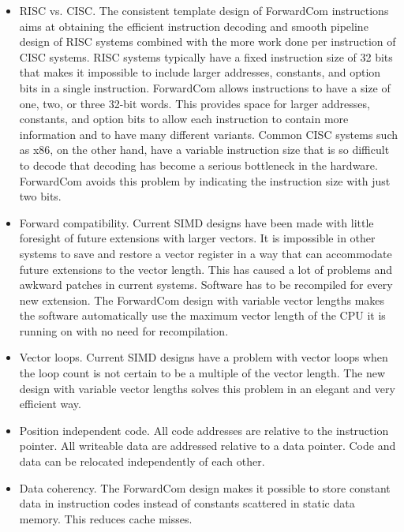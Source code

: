 \documentclass[forwardcom.tex]{subfiles}
\begin{document}
\begin{itemize}
\item RISC vs. CISC. The consistent template design of ForwardCom instructions aims at obtaining the efficient instruction decoding and smooth pipeline design of RISC systems combined with the more work done per instruction of CISC systems. RISC systems typically have a fixed instruction size of 32 bits that makes it impossible to include larger addresses, constants, and option bits in a single instruction. ForwardCom allows instructions to have a size of one, two, or three 32-bit words. This provides space for larger addresses, constants, and option bits to allow each instruction to contain more information and to have many different variants. Common CISC systems such as x86, on the other hand, have a variable instruction size that is so difficult to decode that decoding has become a serious bottleneck in the hardware. ForwardCom avoids this problem by indicating the instruction size with just two bits.

\item Forward compatibility. Current SIMD designs have been made with little foresight of future extensions with larger vectors. It is impossible in other systems to save and restore a vector register in a way that can accommodate future extensions to the vector length. This has caused a lot of problems and awkward patches in current systems. Software has to be recompiled for every new extension. The ForwardCom design with variable vector lengths makes the software automatically use the maximum vector length of the CPU it is running on with no need for recompilation.

\item Vector loops. Current SIMD designs have a problem with vector loops when the loop count is not certain to be a multiple of the vector length. The new design with variable vector lengths solves this problem in an elegant and very efficient way.

\item Position independent code. All code addresses are relative to the instruction pointer. All writeable data are addressed relative to a data  pointer. Code and data can be relocated independently of each other.

\item Data coherency. The ForwardCom design makes it possible to store constant data in instruction codes instead of constants scattered in static data memory. This reduces cache misses.


\end{itemize}
\end{document}
